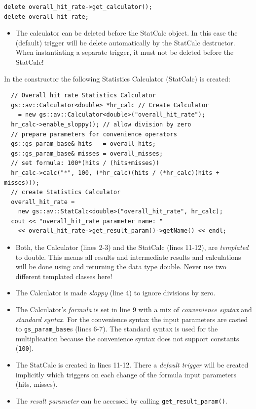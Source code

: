 \begin{lstlisting}
delete overall_hit_rate->get_calculator();
delete overall_hit_rate;
\end{lstlisting}

\begin{itemize}
	\item  The calculator can be deleted before the StatCalc object. In this case the (default) trigger will be delete automatically by the StatCalc destructor. When instantiating a separate trigger, it must not be deleted before the StatCalc!
\end{itemize}

In the constructor the following Statistics Calculator (StatCalc) is created:
\begin{lstlisting}
  // Overall hit rate Statistics Calculator
  gs::av::Calculator<double> *hr_calc // Create Calculator
    = new gs::av::Calculator<double>("overall_hit_rate");
  hr_calc->enable_sloppy(); // allow division by zero
  // prepare parameters for convenience operators
  gs::gs_param_base& hits   = overall_hits;
  gs::gs_param_base& misses = overall_misses;
  // set formula: 100*(hits / (hits+misses))
  hr_calc->calc("*", 100, (*hr_calc)(hits / (*hr_calc)(hits + misses))); 
  // create Statistics Calculator
  overall_hit_rate = 
    new gs::av::StatCalc<double>("overall_hit_rate", hr_calc); 
  cout << "overall_hit_rate parameter name: " 
    << overall_hit_rate->get_result_param()->getName() << endl;
\end{lstlisting}

\begin{itemize}

	\item  Both, the Calculator (lines 2-3) and the StatCalc (lines 11-12), are {\em templated} to double. This means all results and intermediate results and calculations will be done using and returning the data type double. Never use two different templated classes here!

	\item  The Calculator is made {\em sloppy} (line 4) to ignore divisions by zero.
	
	\item  The Calculator's {\em formula} is set in line 9 with a mix of {\em convenience syntax} and {\em standard syntax}. For the convenience syntax the input parameters are casted to \lstinline|gs_param_base|s (lines 6-7). The standard syntax is used for the multiplication because the convenience syntax does not support constants (\lstinline|100|).
	
	 \item The StatCalc is created in lines 11-12. There a {\em default trigger} will be created implicitly which triggers on each change of the formula input parameters (hits, misses).
	 
	 \item The {\em result parameter} can be accessed by calling \lstinline|get_result_param()|.
	
\end{itemize}

